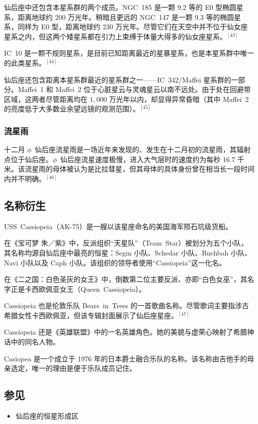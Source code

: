 仙后座中还包含本星系群的两个成员。NGC~185 是一颗 9.2 等的 E0 型椭圆星系，距离地球约 200 万光年。稍暗且更远的 NGC~147 是一颗 9.3 等的椭圆星系，同样为 E0 型，距离地球约 230 万光年。尽管它们在天空中并不位于仙女座星系之内，但这两个矮星系都在引力上束缚于体量大得多的仙女座星系。$^{[43]}$

IC~10 是一颗不规则星系，是目前已知距离最近的星暴星系，也是本星系群中唯一的此类星系。$^{[44]}$

仙后座还包含距离本星系群最近的星系群之一——IC~342/Maffei 星系群的一部分。Maffei~1 和 Maffei~2 位于心脏星云与灵魂星云以南不远处。由于处在回避带区域，这两者尽管距离均在 $1{,}000$ 万光年以内，却显得异常昏暗（其中 Maffei~2 的亮度低于大多数业余望远镜的观测范围）。$^{[45]}$
\subsubsection{流星雨}  
十二月 $\phi$~仙后座流星雨是一场近年来发现的、发生在十二月初的流星雨，其辐射点位于仙后座。$\phi$~仙后座流星速度极慢，进入大气层时的速度约为每秒 16.7 千米。该流星雨的母体被认为是比拉彗星，但其母体的具体身份曾在相当长一段时间内并不明确。$^{[46]}$
\subsection{名称衍生}  
USS~Cassiopeia（AK-75）是一艘以该星座命名的美国海军陨石坑级货船。

在《宝可梦 朱／紫》中，反派组织“天星队”（Team~Star）被划分为五个小队，其名称均源自仙后座中最亮的恒星：Segin 小队、Schedar 小队、Ruchbah 小队、Navi 小队以及 Caph 小队。该组织的领导者使用“Cassiopeia”这一化名。

在《二之国：白色圣灰的女王》中，倒数第二位主要反派、亦即“白色女巫”，其名字正是卡西欧佩亚女王（Queen~Cassiopeia）。

Cassiopeia 也是伦敦乐队 Bears~in~Trees 的一首歌曲名称。尽管歌词主要指涉古希腊女性卡西欧佩亚，但该专辑封面展示了仙后座星座。$^{[47]}$

Cassiopeia 还是《英雄联盟》中的一名英雄角色。她的美貌与虚荣心映射了希腊神话中的同名人物。

Casiopea 是一个成立于 1976 年的日本爵士融合乐队的名称。该名称由吉他手的母亲选定，唯一的理由是便于乐队成员记住。
\subsection{参见}  
\begin{itemize}
\item 仙后座的恒星形成区
\end{itemize}  
